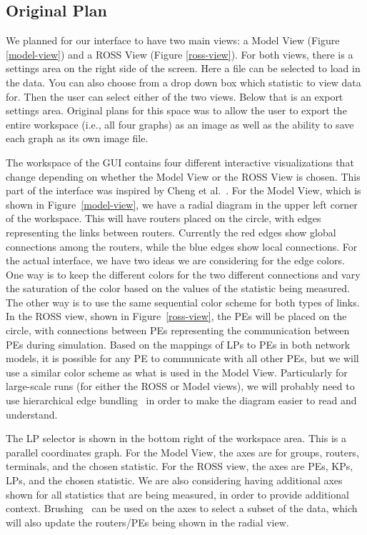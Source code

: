 \documentclass{acm_proc_article-sp}
\begin{document}
\subsection{Original Plan}
We planned for our interface to have two main views: a Model View (Figure \ref{model-view}) and a ROSS View (Figure \ref{ross-view}).  For both views, there is a settings area on the right side of the screen.  Here a file can be selected to load in the data.  You can also choose from a drop down box which statistic to view data for.  Then the user can select either of the two views.  Below that is an export settings area. Original plans for this space was to allow the user to export the entire workspace (i.e., all four graphs) as an image as well as the ability to save each graph as its own image file.  

The workspace of the GUI contains four different interactive visualizations that change depending on whether the Model View or the ROSS View is chosen.  This part of the interface was inspired by Cheng et al.~\cite{cheng}. For the Model View, which is shown in Figure~\ref{model-view}, we have a radial diagram in the upper left corner of the workspace.  This will have routers placed on the circle, with edges representing the links between routers.  Currently the red edges show global connections among the routers, while the blue edges show local connections.  For the actual interface, we have two ideas we are considering for the edge colors.  One way is to keep the different colors for the two different connections and vary the saturation of the color based on the values of the statistic being measured.  The other way is to use the same sequential color scheme for both types of links.  In the ROSS view, shown in Figure~\ref{ross-view}, the PEs will be placed on the circle, with connections between PEs representing the communication between PEs during simulation.  Based on the mappings of LPs to PEs in both network models, it is possible for any PE to communicate with all other PEs, but we will use a similar color scheme as what is used in the Model View.  Particularly for large-scale runs (for either the ROSS or Model views), we will probably need to use hierarchical edge bundling~\cite{jia} in order to make the diagram easier to read and understand.  

The LP selector is shown in the bottom right of the workspace area.  This is a parallel coordinates graph.  For the Model View, the axes are for groups, routers, terminals, and the chosen statistic.  For the ROSS view, the axes are PEs, KPs, LPs, and the chosen statistic.  We are also considering having additional axes shown for all statistics that are being measured, in order to provide additional context.  Brushing~\cite{hauser} can be used on the axes to select a subset of the data, which will also update the routers/PEs being shown in the radial view.  
\end{document}
